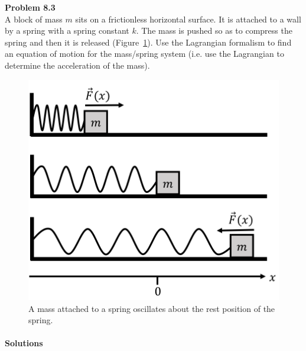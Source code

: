 \begin{framed}
\textbf{Problem 8.3}\\
A block of mass $m$ sits on a frictionless horizontal surface. It is attached to a wall by a spring with a spring constant $k$. The mass is pushed so as to compress the spring and then it is released (Figure~\ref{fig:potentialecons:springmassoscillate}). Use the Lagrangian formalism to find an equation of motion for the mass/spring system (i.e. use the Lagrangian to determine the acceleration of the mass).

\begin{figure}[!htbp]
\centering
\includegraphics[width=0.4\linewidth]{files/massoscillating-022f0299125fb833304e7dba4fbb0cfe.png}
\caption[]{A mass attached to a spring oscillates about the rest position of the spring.}
\label{fig:potentialecons:springmassoscillate}
\end{figure}
\end{framed}

\paragraph{Solutions}

